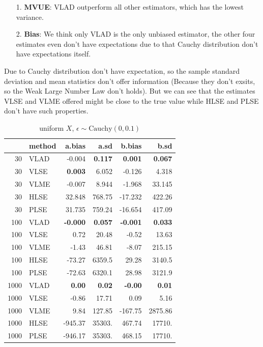 \documentclass[twoside]{article}
\begin{document}
\begin{itemize}
  \item [1.] \textbf{MVUE}: VLAD outperform all other estimators, which has the lowest variance.
  \item [2.] \textbf{Bias}: We think only VLAD is the only unbiased estimator, the other four estimates even don't have expectations due to that Cauchy distribution don't have expectations itself.
\end{itemize}

Due to Cauchy distribution don't have expectation, so the sample standard deviation and mean statistics don't offer information (Because they don't exsits, so the Weak Large Number Law don't holds). But we can see that the estimates VLSE and VLME offered might be close to the true value while HLSE and PLSE don't have such properties.

\begin{table}[ht]
\centering
\caption{uniform $X$, $\epsilon \sim \mathrm{Cauchy}(0,0.1)$}
\begin{tabular}{rlrrrr}
  \hline
 & method & a.bias & a.sd & b.bias & b.sd \\ 
  \hline
  30 & VLAD & -0.004 & \textbf{0.117} & \textbf{0.001} & \textbf{0.067 }\\ 
  30 & VLSE & \textbf{0.003} & 6.052 & -0.126 & 4.318 \\ 
  30 & VLME & -0.007 & 8.944 & -1.968 & 33.145 \\ 
  30 & HLSE & 32.848 & 768.75 & -17.232 & 422.26 \\ 
  30 & PLSE & 31.735 & 759.24 & -16.654 & 417.09 \\ 
  \hline
  100 & VLAD & \textbf{-0.000} & \textbf{0.057} & \textbf{-0.001} & \textbf{0.033} \\ 
  100 & VLSE & 0.72 & 20.48 & -0.52 & 13.63 \\ 
  100 & VLME & -1.43 & 46.81 & -8.07 & 215.15 \\ 
  100 & HLSE & -73.27 & 6359.5 & 29.28 & 3140.5 \\ 
  100 & PLSE & -72.63 & 6320.1 & 28.98 & 3121.9 \\ 
  \hline
  1000 & VLAD & \textbf{0.00} & \textbf{0.02} & \textbf{-0.00} & \textbf{0.01} \\ 
  1000 & VLSE & -0.86 & 17.71 & 0.09 & 5.16 \\ 
  1000 & VLME & 9.84 & 127.85 & -167.75 & 2875.86 \\ 
  1000 & HLSE & -945.37 & 35303. & 467.74 & 17710. \\ 
  1000 & PLSE & -946.17 & 35303. & 468.15 & 17710. \\ 
  \hline
\end{tabular}
\label{cf}
\end{table}
\end{document}
